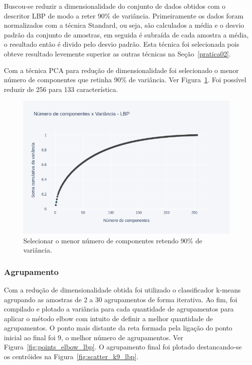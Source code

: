 \documentclass[a4paper, 12 pt, conference]{ieeeconf}  %
\begin{document}
Buscou-se reduzir a dimensionalidade do conjunto de dados obtidos com o descritor LBP de modo a reter 90\% de variância. Primeiramente os dados foram normalizados com a técnica Standard, ou seja, são calculados a média e o desvio padrão da conjunto de amostras, em seguida é subraída de cada amostra a média, o resultado então é divido pelo desvio padrão. Esta técnica foi selecionada pois obteve resultado levemente superior as outras técnicas na Seção~\ref{pratica02}.

Com a técnica PCA para redução de dimensionalidade foi selecionado o menor número de componentes que retinha 90\% de variância. Ver Figura~\ref{fig:points_pca_lbp}. Foi possível reduzir de 256 para 133 característica.

\begin{figure}[!htbp]
	\centering
	\includegraphics[width=1.0\linewidth,clip=true,trim=0cm 0cm 0cm 0cm, keepaspectratio=true]{points_pca_lbp.png}
	\caption{Selecionar o menor número de componentes retendo 90\% de variância.}
	\label{fig:points_pca_lbp}
\end{figure}

\subsubsection{Agrupamento}
Com a redução de dimensionalidade obtida foi utilizado o classificador k-means agrupando as amostras de 2 a 30 agrupamentos de forma iterativa. Ao fim, foi compilado e plotado a variância para cada quantidade de agrupamentos para aplicar o método elbow com intuito de definir a melhor quantidade de agrupamentos. O ponto mais distante da reta formada pela ligação do ponto inicial ao final foi 9, o melhor número de agrupamentos. Ver Figura~\ref{fig:points_elbow_lbp}. O agrupamento final foi plotado destancando-se os centróides na Figura~\ref{fig:scatter_k9_lbp}.
\end{document}
